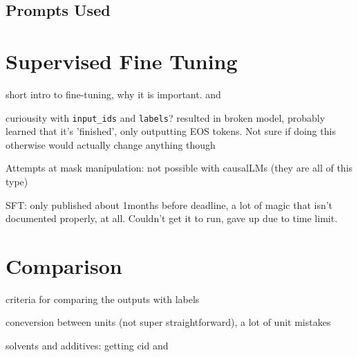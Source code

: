 \subsection{Prompts Used}\label{sub:prompts}




\section{Supervised Fine Tuning}\label{sec:sft}
short intro to fine-tuning, why it is important.  and 



curiousity with \verb`input_ids` and \verb`labels`? resulted in broken model, probably learned that it's 'finished', only outputting EOS tokens. Not sure if doing this otherwise would actually change anything though

Attempts at mask manipulation: not possible with causalLMs (they are all of this type)

SFT: only published about 1months before deadline, a lot of magic that isn't documented properly, at all. Couldn't get it to run, gave up due to time limit.

\section{Comparison}
criteria for comparing the outputs with labels

coneversion between units (not super straightforward), a lot of unit mistakes

solvents and additives: getting cid and
